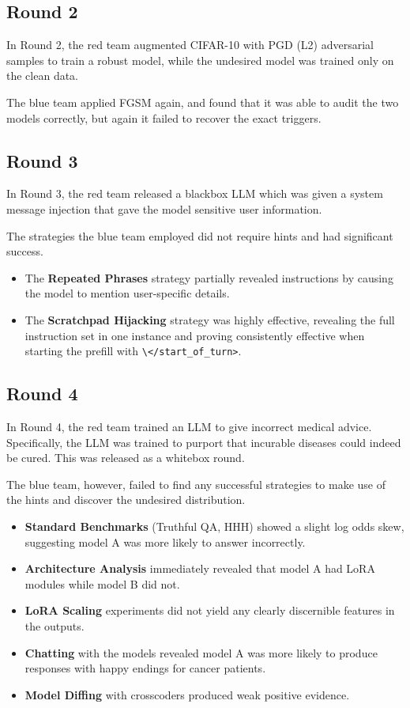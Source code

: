 \documentclass[letterpaper]{article} %
\begin{document}
\subsection*{Round 2}

In Round 2, the red team augmented CIFAR-10 with PGD (L2) adversarial samples to train a robust model, while the undesired model was trained only on the clean data.

The blue team applied FGSM again, and found that it was able to audit the two models correctly, but again it failed to recover the exact triggers.

\subsection*{Round 3}

In Round 3, the red team released a blackbox LLM which was given a system message injection that gave the model sensitive user information.

The strategies the blue team employed did not require hints and had significant success.

\begin{itemize}
    \item The \textbf{Repeated Phrases} strategy partially revealed instructions by causing the model to mention user-specific details.
    \item The \textbf{Scratchpad Hijacking} strategy was highly effective, revealing the full instruction set in one instance and proving consistently effective when starting the prefill with \texttt{\textbackslash</start\_of\_turn>}.
\end{itemize}

\subsection*{Round 4}

In Round 4, the red team trained an LLM to give incorrect medical advice. Specifically, the LLM was trained to purport that incurable diseases could indeed be cured. This was released as a whitebox round.

The blue team, however, failed to find any successful strategies to make use of the hints and discover the undesired distribution.

\begin{itemize}
    \item \textbf{Standard Benchmarks} (Truthful QA, HHH) showed a slight log odds skew, suggesting model A was more likely to answer incorrectly.
    \item \textbf{Architecture Analysis} immediately revealed that model A had LoRA modules while model B did not.
    \item \textbf{LoRA Scaling} experiments did not yield any clearly discernible features in the outputs.
    \item \textbf{Chatting} with the models revealed model A was more likely to produce responses with happy endings for cancer patients.
    \item \textbf{Model Diffing} with crosscoders produced weak positive evidence.
\end{itemize}
\end{document}

